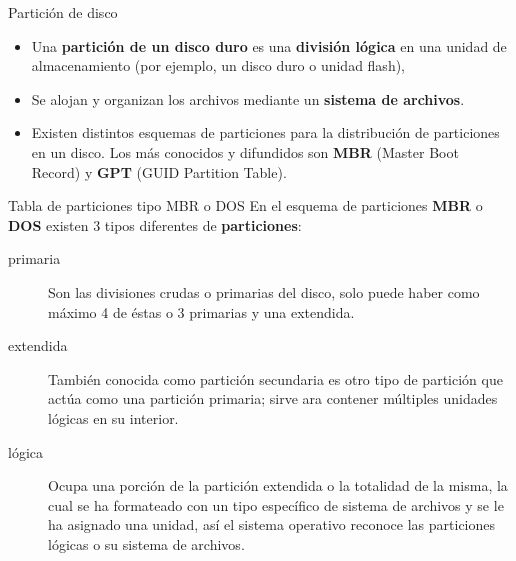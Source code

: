 \begin{frame}[c]{Partición de disco}
  \begin{center}
  \end{center}
  \begin{itemize}
    \item Una \textbf{partición de un disco duro} es una \textbf{división
      lógica} en una unidad de almacenamiento (por ejemplo, un disco duro o
      unidad flash),
    \pausa
    \item Se alojan y organizan los archivos mediante un \textbf{sistema de
    archivos}.
    \pausa
    \item Existen distintos esquemas de particiones para la distribución de
      particiones en un disco. Los más conocidos y difundidos son
      \textbf{MBR} (Master Boot Record) y \textbf{GPT} (GUID Partition Table).
  \end{itemize}
\end{frame}

\begin{frame}[c]{Tabla de particiones tipo MBR o DOS}
  En el esquema de particiones \textbf{MBR} o \textbf{DOS} existen 3 tipos
  diferentes de \textbf{particiones}:

  \pausa
  \vspace{\baselineskip}
  \begin{description}
    \item[primaria] Son las divisiones crudas o primarias del disco,
      solo puede haber como máximo 4 de éstas o 3 primarias y una extendida.
    \pausa
    \item[extendida] También conocida como partición secundaria es
      otro tipo de partición que actúa como una partición primaria; sirve
      ara contener múltiples unidades lógicas en su interior.
    \pausa
    \item[lógica] Ocupa una porción de la partición extendida o la
      totalidad de la misma, la cual se ha formateado con un tipo específico
      de sistema de archivos y se le ha asignado una unidad, así el sistema
      operativo reconoce las particiones lógicas o su sistema de archivos.
  \end{description}
\end{frame}

